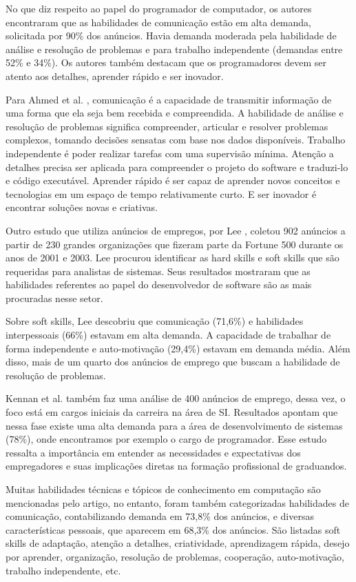 No que diz respeito ao papel do programador de computador, os autores encontraram que as habilidades de comunicação estão em alta demanda, solicitada por 90\% dos anúncios. Havia demanda moderada pela habilidade de análise e resolução de problemas e para trabalho independente (demandas entre 52\% e 34\%). Os autores também destacam que os programadores devem ser atento aos detalhes, aprender rápido e ser inovador.

Para Ahmed et al. \cite{ahmed:12}, comunicação é a capacidade de transmitir informação de uma forma que ela seja bem recebida e compreendida. A habilidade de análise e resolução de problemas significa compreender, articular e resolver problemas complexos, tomando decisões sensatas com base nos dados disponíveis. Trabalho independente é poder realizar tarefas com uma supervisão mínima. Atenção a detalhes precisa ser aplicada para compreender o projeto do software e traduzi-lo e código executável. Aprender rápido é ser capaz de aprender novos conceitos e tecnologias em um espaço de tempo relativamente curto. E ser inovador é encontrar soluções novas e criativas.

Outro estudo que utiliza anúncios de empregos, por Lee \cite{lee:05}, coletou 902 anúncios a partir de 230 grandes organizações que fizeram parte da Fortune 500 durante os anos de 2001 e 2003. Lee procurou identificar as hard skills e soft skills que são requeridas para analistas de sistemas. Seus resultados mostraram que as habilidades referentes ao papel do desenvolvedor de software são as mais procuradas nesse setor.

Sobre soft skills, Lee descobriu que comunicação (71,6\%) e habilidades interpessoais (66\%) estavam em alta demanda. A capacidade de trabalhar de forma independente e auto-motivação (29,4\%) estavam em demanda média. Além disso, mais de um quarto dos anúncios de emprego que buscam a habilidade de resolução de problemas.

Kennan et al. \cite{kennan:09} também faz uma análise de 400 anúncios de emprego, dessa vez, o foco está em cargos iniciais da carreira na área de SI. Resultados apontam que nessa fase existe uma alta demanda para a área de desenvolvimento de sistemas (78\%), onde encontramos por exemplo o cargo de programador. Esse estudo ressalta a importância em entender as necessidades e expectativas dos empregadores e suas implicações diretas na formação profissional de graduandos.

Muitas habilidades técnicas e tópicos de conhecimento em computação são mencionadas pelo artigo, no entanto, foram também categorizadas habilidades de comunicação, contabilizando demanda em 73,8\% dos anúncios, e diversas características pessoais, que aparecem em 68,3\% dos anúncios. São listadas soft skills de adaptação, atenção a detalhes, criatividade, aprendizagem rápida, desejo por aprender, organização, resolução de problemas, cooperação, auto-motivação, trabalho independente, etc. 

